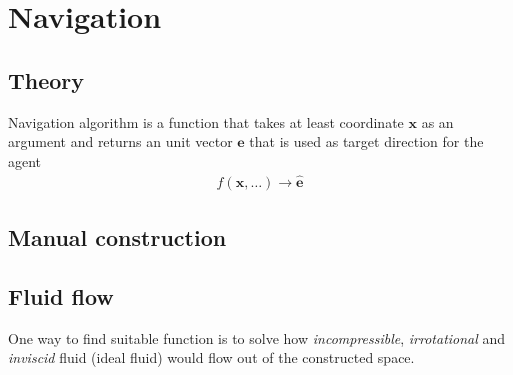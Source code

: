 \section{Navigation}
\subsection{Theory}
Navigation algorithm is a function that takes at least coordinate $ \mathbf{x} $ as an argument and returns an unit vector $ \hat{\mathbf{e}} $ that is used as target direction for the agent
\begin{align}
f(\mathbf{x}, \ldots) \to \hat{\mathbf{e}}
\end{align}


\subsection{Manual construction}


\subsection{Fluid flow}
One way to find suitable function is to solve how \emph{incompressible}, \emph{irrotational} and \emph{inviscid} fluid (ideal fluid) would flow out of the constructed space.

